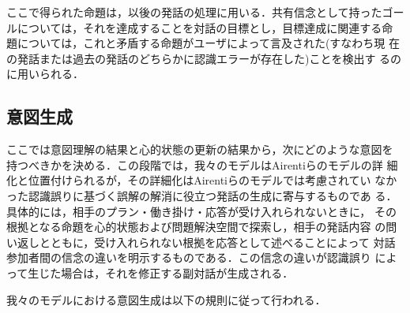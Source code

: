 ここで得られた命題は，以後の発話の処理に用いる．共有信念として持ったゴー
ルについては，それを達成することを対話の目標とし，目標達成に関連する命
題については，これと矛盾する命題がユーザによって言及された(すなわち現
在の発話または過去の発話のどちらかに認識エラーが存在した)ことを検出す
るのに用いられる．

\subsection{意図生成}

ここでは意図理解の結果と心的状態の更新の結果から，次にどのような意図を
持つべきかを決める．この段階では，我々のモデルはAirentiらのモデルの詳
細化と位置付けられるが，その詳細化はAirentiらのモデルでは考慮されてい
なかった認識誤りに基づく誤解の解消に役立つ発話の生成に寄与するものであ
る．具体的には，相手のプラン・働き掛け・応答が受け入れられないときに，
その根拠となる命題を心的状態および問題解決空間で探索し，相手の発話内容
の問い返しとともに，受け入れられない根拠を応答として述べることによって
対話参加者間の信念の違いを明示するものである．この信念の違いが認識誤り
によって生じた場合は，それを修正する副対話が生成される．

我々のモデルにおける意図生成は以下の規則に従って行われる．

